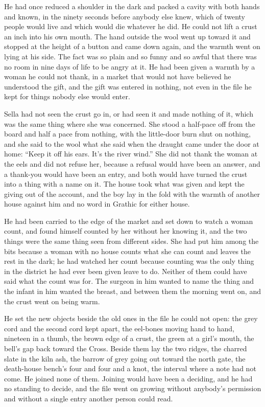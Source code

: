 He had once reduced a shoulder in the dark and packed a cavity with both hands and known, in the ninety seconds before anybody else knew, which of twenty people would live and which would die whatever he did. He could not lift a crust an inch into his own mouth. The hand outside the wool went up toward it and stopped at the height of a button and came down again, and the warmth went on lying at his side. The fact was so plain and so funny and so awful that there was no room in nine days of life to be angry at it. He had been given a warmth by a woman he could not thank, in a market that would not have believed he understood the gift, and the gift was entered in nothing, not even in the file he kept for things nobody else would enter.

Sella had not seen the crust go in, or had seen it and made nothing of it, which was the same thing where she was concerned. She stood a half-pace off from the board and half a pace from nothing, with the little-door burn shut on nothing, and she said to the wool what she said when the draught came under the door at home: “Keep it off his ears. It's the river wind.” She did not thank the woman at the eels and did not refuse her, because a refusal would have been an answer, and a thank-you would have been an entry, and both would have turned the crust into a thing with a name on it. The house took what was given and kept the giving out of the account, and the boy lay in the fold with the warmth of another house against him and no word in Grathic for either house.

He had been carried to the edge of the market and set down to watch a woman count, and found himself counted by her without her knowing it, and the two things were the same thing seen from different sides. She had put him among the bits because a woman with no house counts what she can count and leaves the rest in the dark; he had watched her count because counting was the only thing in the district he had ever been given leave to do. Neither of them could have said what the count was for. The surgeon in him wanted to name the thing and the infant in him wanted the breast, and between them the morning went on, and the crust went on being warm.

He set the new objects beside the old ones in the file he could not open: the grey cord and the second cord kept apart, the eel-bones moving hand to hand, nineteen in a thumb, the brown edge of a crust, the green at a girl's mouth, the bell's gap back toward the Cross. Beside them lay the two  ridges, the charred slate in the kiln ash, the barrow of grey going out toward the north gate, the death-house bench's four and four and a knot, the interval where a note had not come. He joined none of them. Joining would have been a deciding, and he had no standing to decide, and the file went on growing without anybody's permission and without a single entry another person could read.

